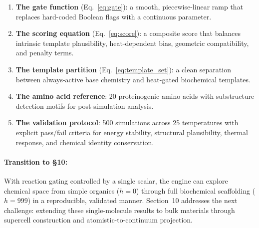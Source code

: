 \documentclass[11pt]{article}
\begin{document}
\begin{enumerate}
\item \textbf{The gate function} (Eq.~\ref{eq:gate}): a smooth,
      piecewise-linear ramp that replaces hard-coded Boolean flags with a
      continuous parameter.
\item \textbf{The scoring equation} (Eq.~\ref{eq:score}): a composite score
      that balances intrinsic template plausibility, heat-dependent bias,
      geometric compatibility, and penalty terms.
\item \textbf{The template partition} (Eq.~\ref{eq:template_set}): a clean
      separation between always-active base chemistry and heat-gated
      biochemical templates.
\item \textbf{The amino acid reference}: 20 proteinogenic amino acids with
      substructure detection motifs for post-simulation analysis.
\item \textbf{The validation protocol}: 500 simulations across 25
      temperatures with explicit pass/fail criteria for energy stability,
      structural plausibility, thermal response, and chemical identity
      conservation.
\end{enumerate}

\paragraph{Transition to \S10:}
With reaction gating controlled by a single scalar, the engine can explore
chemical space from simple organics ($h = 0$) through full biochemical
scaffolding ($h = 999$) in a reproducible, validated manner.  Section~10
addresses the next challenge: extending these single-molecule results to
bulk materials through supercell construction and atomistic-to-continuum
projection.
\end{document}

